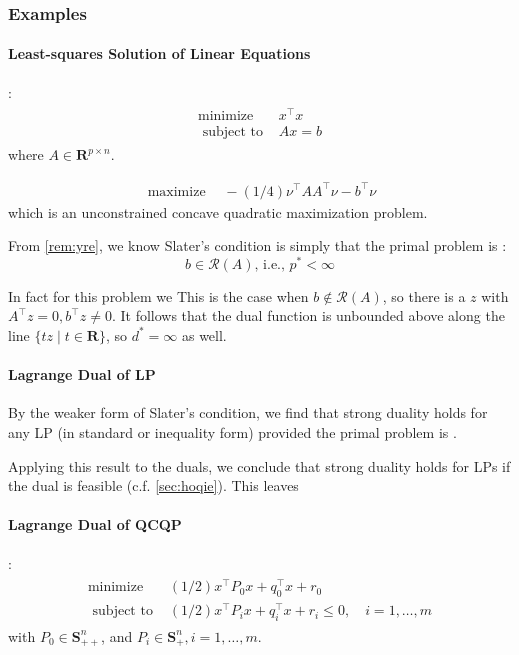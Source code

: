 \documentclass{article}
\begin{document}
\subsubsection{Examples}
\paragraph{Least-squares Solution of Linear Equations}
:
\begin{align*}
\begin{array}{ll}
\operatorname{minimize} & x^{\top} x \\
\text { subject to } & A x=b
\end{array}
\end{align*}
where $A \in \mathbf{R}^{p \times n}$.

\begin{align*}
\operatorname{maximize} \quad-(1 / 4) \nu^{\top} A A^{\top} \nu-b^{\top} \nu
\end{align*}
which is an unconstrained concave quadratic maximization problem.


From \cref{rem:yre}, we know Slater's condition is simply that the primal problem is :
 $$\text{$b \in \mathcal{R}(A)$, i.e., }p^* <\infty$$ 

In fact for this problem we  This is the case when $b \notin \mathcal{R}(A)$, so there is a $z$ with $A^{\top} z=0, b^{\top} z \neq 0 .$ It follows that the dual function is unbounded above along the line $\{t z \mid t \in \mathbf{R}\}$, so $d^* =\infty$ as well.
\paragraph{Lagrange Dual of LP}\label{sec:hhyr}
By the weaker form of Slater's condition, we find that strong duality holds for any LP (in standard or inequality form) provided the primal problem is . 

Applying this result to the duals, we conclude that strong duality holds for LPs if the dual is feasible (c.f. \cref{sec:hoqie}). This leaves  

\paragraph{Lagrange Dual of QCQP}
:
\begin{align}
\begin{array}{ll}
\operatorname{minimize} & (1 / 2) x^{\top} P_{0} x+q_{0}^{\top} x+r_{0} \\
\text { subject to } & (1 / 2) x^{\top} P_{i} x+q_{i}^{\top} x+r_{i} \leq 0, \quad i=1, \ldots, m
\end{array}\label{eq:htb}
\end{align}
with $P_{0} \in \mathbf{S}_{++}^{n}$, and $P_{i} \in \mathbf{S}_{+}^{n}, i=1, \ldots, m$. 
\end{document}
